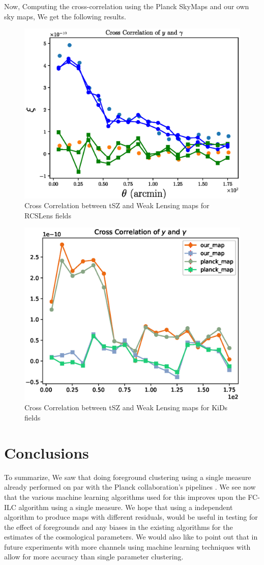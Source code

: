Now, Computing the cross-correlation using the Planck SkyMaps and our own sky maps, We get the following results.
\begin{figure}[H]
  \centering
  \label{results}
  \includegraphics[width=0.7\linewidth]{plot_rcs.eps}
  \caption{Cross Correlation between tSZ and Weak Lensing maps for RCSLens fields}
\end{figure}

\begin{figure}[H]
  \centering
  \label{results}
  \includegraphics[width=0.7\linewidth]{plot_kids.eps}
  \caption{Cross Correlation between tSZ and Weak Lensing maps for KiDs fields}
\end{figure}

\chapter{ Conclusions}
\label{conc}
      To summarize, We saw that doing foreground clustering using a single measure already
performed on par with the Planck collaboration's pipelines \cite{datarishi}.
We see now that the various machine learning algorithms used for this improves upon the FC-ILC
algorithm using a single measure. We hope that using a independent algorithm to produce maps with
different residuals, would be useful in testing for the effect of foregrounds and any biases in
the existing algorithms for the estimates of the cosmological parameters. We would also like to
point out that in future experiments with more channels using machine learning techniques
with allow for more accuracy than single parameter clustering. 


